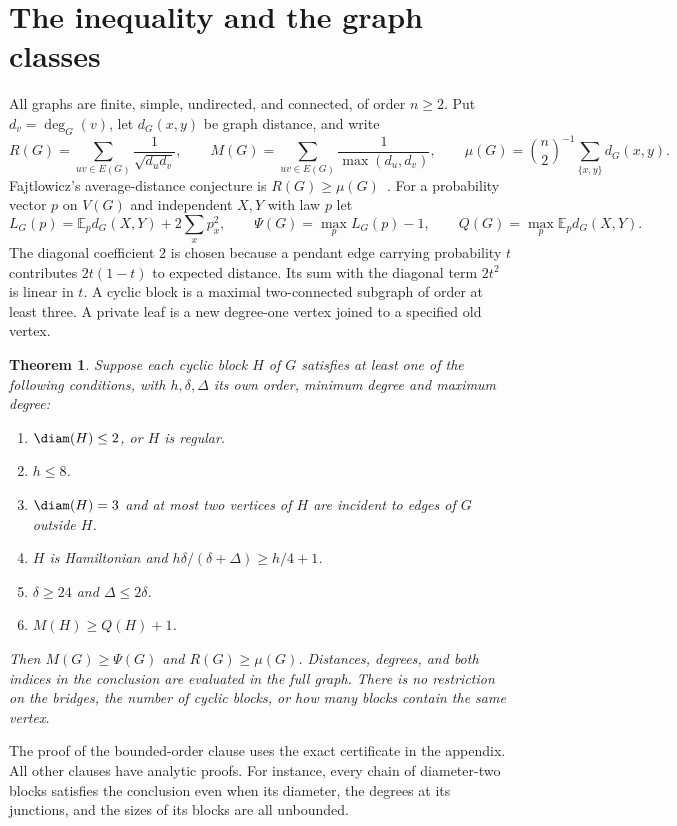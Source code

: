 \documentclass[11pt,a4paper]{article}
\newtheorem{theorem}{Theorem}[section]
\begin{document}
\section{The inequality and the graph classes}
All graphs are finite, simple, undirected, and connected, of order $n\ge2$.
Put $d_v=\deg_G(v)$, let $d_G(x,y)$ be graph distance, and write
\[
 R(G)=\sum_{uv\in E(G)}\frac1{\sqrt{d_ud_v}},\qquad
 M(G)=\sum_{uv\in E(G)}\frac1{\max(d_u,d_v)},\qquad
 \mu(G)=\binom n2^{-1}\sum_{\{x,y\}}d_G(x,y).
\]
Fajtlowicz's average-distance conjecture is $R(G)\ge\mu(G)$~\cite{p11-Fajt,p11-Trees,p11-Uni}. For a probability vector $p$ on $V(G)$ and independent $X,Y$ with law $p$ let
\[
 L_G(p)=\mathbb E_p d_G(X,Y)+2\sum_x p_x^2,\qquad
 \Psi(G)=\max_p L_G(p)-1,\qquad Q(G)=\max_p\mathbb E_p d_G(X,Y).
\]
The diagonal coefficient $2$ is chosen because a pendant edge carrying probability $t$ contributes $2t(1-t)$ to expected distance. Its sum with the diagonal term $2t^2$ is linear in $t$.
A cyclic block is a maximal two-connected subgraph of order at least three.
A private leaf is a new degree-one vertex joined to a specified old vertex.
\begin{theorem}\label{p11-thm:main}
Suppose each cyclic block $H$ of $G$ satisfies at least one of the following conditions, with $h,\delta,\Delta$ its own order, minimum degree and maximum degree:
\begin{enumerate}
\item $\diam(H)\le2$, or $H$ is regular.
\item $h\le8$.
\item $\diam(H)=3$ and at most two vertices of $H$ are incident to edges of $G$ outside $H$.
\item $H$ is Hamiltonian and $h\delta/(\delta+\Delta)\ge h/4+1$.
\item $\delta\ge24$ and $\Delta\le2\delta$.
\item $M(H)\ge Q(H)+1$.
\end{enumerate}
Then $M(G)\ge\Psi(G)$ and $R(G)\ge\mu(G)$. Distances, degrees, and both indices in the conclusion are evaluated in the full graph. There is no restriction on the bridges, the number of cyclic blocks, or how many blocks contain the same vertex.
\end{theorem}
The proof of the bounded-order clause uses the exact certificate in the appendix. All other clauses have analytic proofs. For instance, every chain of diameter-two blocks satisfies the conclusion even when its diameter, the degrees at its junctions, and the sizes of its blocks are all unbounded.
\end{document}
